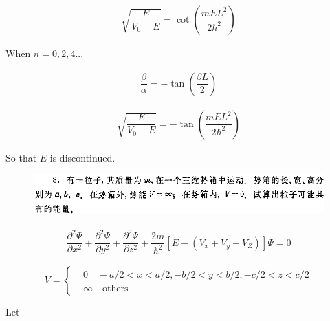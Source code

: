 \documentclass{article}
\begin{document}
\begin{equation*}
  \begin{aligned}
    \sqrt{\dfrac{E}{V_0 - E} } = \cot \left( \dfrac{m E L^2}{2 \hbar^2}  \right)
  \end{aligned}
\end{equation*}

When $n = 0,2,4...$

\begin{equation*}
  \begin{aligned}
    \dfrac{\beta}{\alpha} = - \tan \left(\dfrac{\beta L}{2}   \right) 
  \end{aligned}
\end{equation*}

\begin{equation*}
  \begin{aligned}
    \sqrt{\dfrac{E}{V_0 - E} } = - \tan \left( \dfrac{m E L^2}{2 \hbar^2}  \right)
  \end{aligned}
\end{equation*}

So that $E$ is discontinued.

\begin{figure}[H]
  \centering
  \includegraphics[width=\linewidth]{figures/8}
  \label{fig:}
\end{figure}

\begin{equation*}
  \begin{aligned}
    \dfrac{\partial^2 \Psi}{\partial x^2} + \dfrac{\partial^2 \Psi}{\partial y^2} + \dfrac{\partial^2 \Psi}{\partial z^2} + \dfrac{2 m }{\hbar^2} \left[ E - \left( V_x + V_y + V_Z \right) \right] \Psi = 0  
  \end{aligned}
\end{equation*}

\begin{equation*}
  V = \left\{
  \begin{aligned}
    & 0 \quad - a/2 < x < a/2, - b/2 < y < b/2, - c/2 < z < c/2 \\
    & \infty \quad \mathrm{others}
  \end{aligned}
  \right.
\end{equation*}



Let
\end{document}
